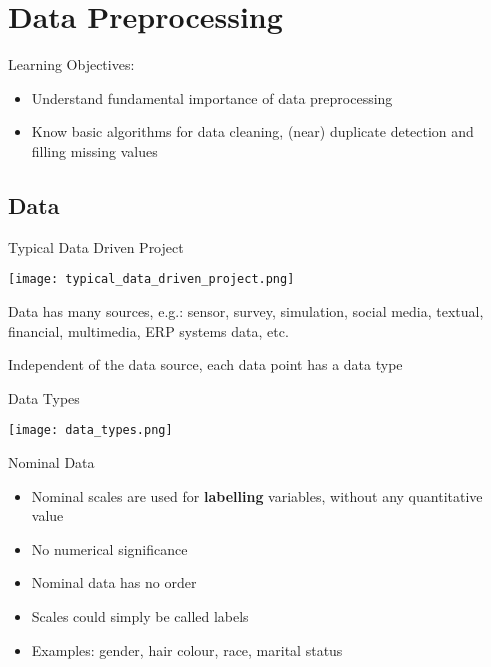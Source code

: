\section{Data Preprocessing}

\begin{remark}
    Learning Objectives:
    \begin{itemize}
        \item Understand fundamental importance of data preprocessing
        \item Know basic algorithms for data cleaning, (near) duplicate detection and filling missing values
    \end{itemize}
\end{remark}

\subsection{Data}

\begin{concept}{Typical Data Driven Project}

    \texttt{[image: typical\_data\_driven\_project.png]}
\end{concept}

\begin{definition}{Data} has many sources, e.g.: 
    sensor, survey, simulation, social media, textual, financial, multimedia, ERP systems data, etc.
    
    Independent of the data source, each data point has a data type
\end{definition}

\begin{theorem}{Data Types}
    
    \texttt{[image: data\_types.png]}
\end{theorem}

\begin{corollary}{Nominal Data}
    \begin{itemize}
        \item Nominal scales are used for \textbf{labelling} variables, without any quantitative value
        \item No numerical significance
        \item Nominal data has no order
        \item Scales could simply be called labels
        \item Examples: gender, hair colour, race, marital status
    \end{itemize}
\end{corollary}

